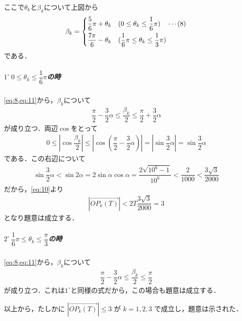\documentclass[../../main.tex]{subfiles}
\begin{document}
ここで$\theta_k$と$\beta_k$について上図から
\begin{align}
  \beta_k =
  \begin{dcases}
    \dfrac{5}{6}\pi + \theta_k \quad (0 \le \theta_k \le \dfrac{1}{6}\pi) \quad \cdots (8) \\
    \dfrac{7\pi}{6} - \theta_k \quad (\dfrac{1}{6}\pi \le \theta_k \le \dfrac{1}{3}\pi)
  \end{dcases} \label{eq:11}
\end{align}
である．

\subparagraph{$1^\circ \ 0 \le \theta_k \le \dfrac{1}{6}\pi$の時}

\cref{eq:8,eq:11}から，$\beta_k$について
\begin{align}
  \dfrac{\pi}{2} - \dfrac{3}{2}\alpha \le \dfrac{\beta_k}{2} \le \dfrac{\pi}{2} + \dfrac{3}{2}\alpha
\end{align}
が成り立つ．両辺$\cos$をとって
\begin{align}
  0 \le \left|\cos \dfrac{\beta_k}{2}\right| \le \left|\cos(\dfrac{\pi}{2} - \dfrac{3}{2}\alpha)\right| = \left|\sin \dfrac{3}{2}\alpha \right| = \sin \dfrac{3}{2}\alpha
\end{align}
である．この右辺について
\begin{align}
  \sin \dfrac{3}{2}\alpha < \sin 2\alpha = 2 \sin \alpha \cos \alpha = \dfrac{2 \sqrt{10^6 - 1}}{10^6} < \dfrac{2}{1000} < \dfrac{3\sqrt{3}}{2000}
\end{align}
だから，\cref{eq:10}より
\begin{align}
  |\overrightarrow{OP_k(T)}| < 2T \dfrac{3\sqrt{3}}{2000} = 3
\end{align}
となり題意は成立する．

\subparagraph{$2^\circ \ \dfrac{1}{6}\pi \le \theta_k \le \dfrac{\pi}{3}$の時}

\cref{eq:8,eq:11}から，$\beta_k$について
\begin{align}
  \dfrac{\pi}{2} - \dfrac{3}{2}\alpha \le \dfrac{\beta_k}{2} \le \dfrac{\pi}{2}
\end{align}
が成り立つ．これは$1^{\circ}$と同様の式だから，この場合も題意は成立する．
\casesend

以上から，たしかに $|\overrightarrow{OP_k(T)}| \le 3$ が $k=1,2,3$ で成立し，題意は示された．
\end{document}
